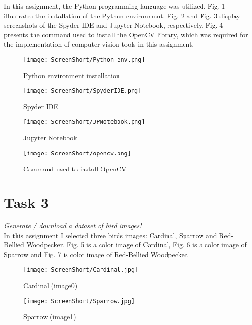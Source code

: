 \documentclass[conference,12pt]{IEEEtran}
\begin{document}
In this assignment, the Python programming language was utilized. Fig. 1 illustrates the installation of the Python environment. Fig. 2 and Fig. 3 display screenshots of the Spyder IDE and Jupyter Notebook, respectively. Fig. 4 presents the command used to install the OpenCV library, which was required for the implementation of computer vision tools in this assignment.

\begin{figure}[h!]
    \centering
    \texttt{[image: ScreenShort/Python\_env.png]}
    \caption{Python environment installation}
\end{figure}

\begin{figure}[h!]
    \centering
    \texttt{[image: ScreenShort/SpyderIDE.png]}
    \caption{Spyder IDE}
\end{figure}

\begin{figure}[h!]
    \centering
    \texttt{[image: ScreenShort/JPNotebook.png]}
    \caption{Jupyter Notebook}
\end{figure}


\begin{figure}[h!]
    \centering
    \texttt{[image: ScreenShort/opencv.png]}
    \caption{Command used to install OpenCV}
\end{figure}

\section{Task 3}
\textit{Generate / download a dataset of bird images!}\\
    In this assignment I selected three birds images: Cardinal, Sparrow and 
Red-Bellied Woodpecker. Fig. 5 is a color image of Cardinal, Fig. 6 is a color image of Sparrow and Fig. 7 is color image of Red-Bellied Woodpecker.


\begin{figure}[h!]
    \centering
    \texttt{[image: ScreenShort/Cardinal.jpg]}
    \caption{Cardinal (image0)}
\end{figure}

\begin{figure}[h!]
    \centering
    \texttt{[image: ScreenShort/Sparrow.jpg]}
    \caption{Sparrow (image1)}
\end{figure}
\end{document}
